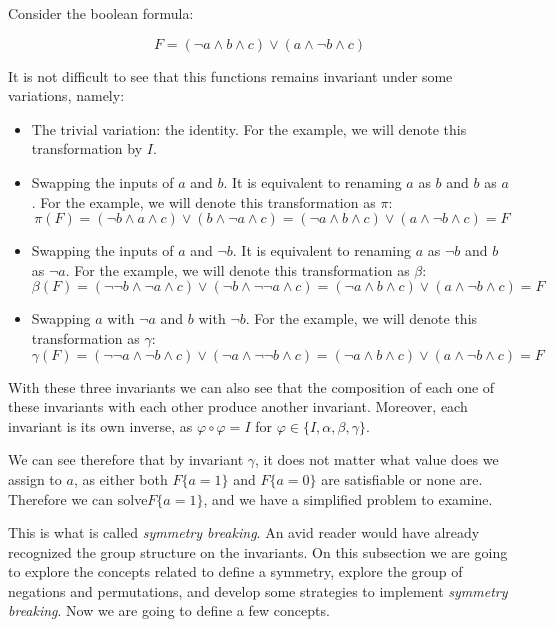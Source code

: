 \begin{example}
Consider the boolean formula:

$$ F = (\neg a \land b  \land c) \lor (a \land \neg b \land c)$$

It is not difficult to see that this functions remains invariant under some variations, namely:

\begin{itemize}
\item The trivial variation: the identity. For the example, we will denote this transformation by  $I$.

\item Swapping the inputs of $a$ and $b$. It is equivalent to renaming $a$ as $b$ and $b$ as $a$. For the example, we will denote this transformation as $\pi$: 
  $$\pi(F) = (\neg b \land a  \land c) \lor (b \land \neg a \land c) = (\neg a \land b  \land c) \lor (a \land \neg b \land c) = F$$
\item Swapping the inputs of $a$ and $\neg b$. It is equivalent to renaming $a$ as $\neg b$ and $b$ as $\neg a$. For the example, we will denote this transformation as $\beta$: 
  $$\beta(F) = (\neg \neg b \land \neg a  \land c) \lor (\neg b \land \neg \neg a \land c) = (\neg a \land b  \land c) \lor (a \land \neg b \land c) = F$$

\item Swapping $a$ with $\neg a$ and $b$ with $\neg b$. For the example, we will denote this transformation as $\gamma$: 
  $$\gamma(F) = (\neg \neg a \land \neg b  \land c) \lor (\neg a \land \neg \neg b \land c) = (\neg a \land b  \land c) \lor (a \land \neg b \land c) = F$$
\end{itemize}

With these three invariants we can also see that the composition of each one of these invariants with each other produce another invariant. Moreover, each invariant is its own inverse, as $\varphi \circ \varphi = I $ for $\varphi \in \{I, \alpha, \beta, \gamma\}$.

We can see therefore that by invariant $\gamma$, it does not matter what value does we assign to $a$, as either both $F\{a = 1\}$ and $F\{a=0\}$ are satisfiable or none are. Therefore we can solve$F\{a=1\}$, and we have a simplified problem to examine.

\end{example}



This is what is called \emph{symmetry breaking}. An avid reader would have already recognized the group structure on the invariants.  On this subsection we are going to explore the concepts related to define a symmetry, explore the group of negations and permutations, and develop some strategies to implement \emph{symmetry breaking}.  Now we are going to define a few concepts.


